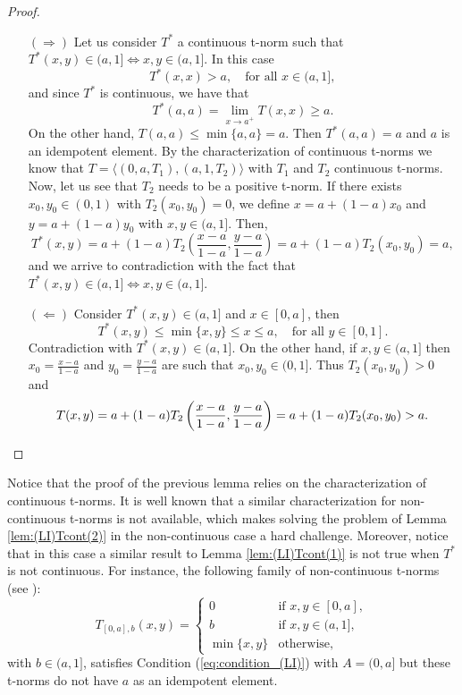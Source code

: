 \begin{proof}
	\begin{itemize}
		\item[$(\Rightarrow)$] Let us consider $T^*$ a continuous t-norm such that $T^*(x,y) \in (a,1] \Leftrightarrow x,y \in (a,1]$. In this case
		$$T^*(x,x) >a, \quad \text{for all } x \in (a,1],$$
		and since $T^*$ is continuous, we have that
		$$T^*(a,a)=\lim_{x \to a^+} T(x,x) \geq a.$$
		On the other hand, $T(a,a) \leq \min\{a,a\} =a$. Then $T^*(a,a)=a$ and $a$ is an idempotent element. By the characterization of continuous t-norms we know that $T=\langle (0,a,T_1),(a,1,T_2)\rangle$ with $T_1$ and $T_2$ continuous t-norms. Now, let us see that $T_2$ needs to be a positive t-norm. If there exists $x_0,y_0 \in (0,1)$ with $T_2(x_0,y_0)=0$, we define $x=a+(1-a)x_0$ and $y=a+(1-a)y_0$ with $x,y \in(a,1]$. Then,
		$$T^*(x,y)=a+(1-a)T_2 \left(\frac{x-a}{1-a},\frac{y-a}{1-a}\right)=a+(1-a)T_2(x_0,y_0)=a,$$
		and we arrive to contradiction with the fact that $T^*(x,y) \in (a,1] \Leftrightarrow x,y \in (a,1]$.
		\item[$(\Leftarrow)$] Consider $T^*(x,y) \in (a,1]$ and $x \in [0,a]$, then
		$$T^*(x,y) \leq \min\{x,y\} \leq x \leq a, \quad \text{for all } y \in [0,1].$$
		Contradiction with $T^*(x,y) \in (a,1]$. On the other hand, if $x,y \in (a,1]$ then $x_0=\frac{x-a}{1-a}$ and $y_0=\frac{y-a}{1-a}$ are such that $x_0,y_0 \in (0,1]$. Thus $T_2(x_0,y_0)>0$ and
		$$T(x,y)=a+(1-a)T_2\left(\frac{x-a}{1-a},\frac{y-a}{1-a}\right)=a+(1-a)T_2(x_0,y_0)>a. \vspace{-0.5cm}$$ \qedhere
	\end{itemize}
\end{proof}
Notice that the proof of the previous lemma relies on the characterization of continuous t-norms. It is well known that a similar characterization for non-continuous t-norms is not available, which makes solving the problem of Lemma \ref{lem:(LI)Tcont(2)} in the non-continuous case a hard challenge. Moreover, notice that in this case a similar result to Lemma \ref{lem:(LI)Tcont(1)} is not true when $T^*$ is not continuous. For instance, the following family of non-continuous t-norms (see \cite[Proposition 3.66]{Klement2000}):
$$
T_{[0,a],b}(x,y)=
\left\{ \begin{array}{ll}
	0 &   \text{if }   x,y \in [0,a], \\
	b &  \text{if }   x,y \in (a,1], \\
	\min\{x,y\} & \text{otherwise,}
\end{array}
\right.
$$
with $b \in (a,1]$, satisfies Condition (\ref{eq:condition_(LI)}) with $A=(0,a]$ but these t-norms do not have $a$ as an idempotent element.\\
